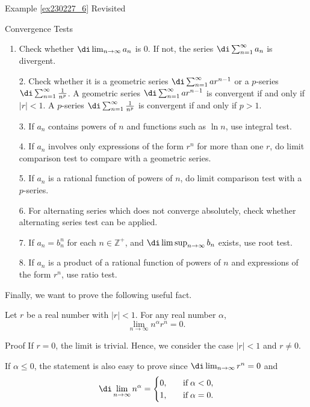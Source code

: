 \begin{example}{\linkt Example \ref{ex230227_6} Revisited}
\begin{example}[label=ex230227_13]{}
\begin{highlight}{Convergence Tests}
\begin{enumerate}[1.]
\item   Check whether $\di\lim_{n\to\infty}a_n$ is 0. If not, the series $\di\sum_{n=1}^{\infty}a_n$ is divergent.\end{enumerate}\end{highlight}\begin{highlight}{}\begin{enumerate}[1.] 
\item[2.] Check whether it is a geometric series $\di\sum_{n=1}^{\infty}ar^{n-1}$ or a $p$-series $\di\sum_{n=1}^{\infty}\frac{1}{n^p}$. A geometric series $\di\sum_{n=1}^{\infty}ar^{n-1}$ is convergent if and only if $|r|<1$. A $p$-series $\di\sum_{n=1}^{\infty}\frac{1}{n^p}$ is convergent if and only if $p>1$.
\item[3.] If $a_n$ contains powers of $n$ and functions such as $\ln n$, use integral test.
\item[4.] If  $a_n$ involves only expressions of the form $r^n$ for more than one $r$, do limit comparison test to compare with a geometric series.
\item[5.] If  $a_n$ is a rational function of powers of  $n$, do limit comparison test with a $p$-series.
\item[6.]  For alternating series which does not converge absolutely, check whether alternating series test can be applied.
\item[7.] If $a_n=b_n^n$ for each $n\in\mathbb{Z}^+$, and $\di\limsup_{n\to\infty}b_n$ exists, use root test.
\item[8.]  If $a_n$ is a product of a rational function of powers of $n$ and expressions of the form $r^n$, use ratio test.
\end{enumerate}
\end{highlight}

Finally, we want to prove the following useful fact.
\begin{theorem}[label=230306_1]{}
Let $r$ be a real number with $|r|<1$. For any real number $\alpha$, \[\lim_{n\to\infty}n^{\alpha}r^n=0.\]
\end{theorem}\begin{myproof}{Proof}
If $r=0$, the limit is trivial. Hence, we consider the case $|r|<1$ and $r\neq 0$.

If $\alpha\leq 0$, the statement is also easy to prove since $\di\lim_{n\to\infty}r^n=0$ and \bp\[\di\lim_{n\to\infty}n^{\alpha}=\begin{cases}0,\quad&\text{if}\;\alpha<0, \\1, \quad & \text{if}\;\alpha=0.\end{cases}\]



\end{myproof}
\end{example}
\end{example}
